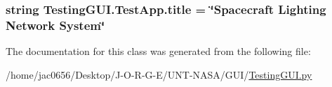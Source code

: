 \subsubsection[{\texorpdfstring{title}{title}}]{\setlength{\rightskip}{0pt plus 5cm}string Testing\+G\+U\+I.\+Test\+App.\+title = \char`\"{}Spacecraft Lighting Network System\char`\"{}\hspace{0.3cm}{\ttfamily [static]}}\hypertarget{classTestingGUI_1_1TestApp_a8ed3f749511e756286c7216e71665c65}{}\label{classTestingGUI_1_1TestApp_a8ed3f749511e756286c7216e71665c65}


The documentation for this class was generated from the following file\+:\begin{DoxyCompactItemize}
\item 
/home/jac0656/\+Desktop/\+J-\/\+O-\/\+R-\/\+G-\/\+E/\+U\+N\+T-\/\+N\+A\+S\+A/\+G\+U\+I/\hyperlink{GUI_2TestingGUI_8py}{Testing\+G\+U\+I.\+py}\end{DoxyCompactItemize}
